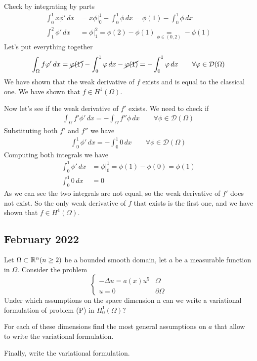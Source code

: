 Check by integrating by parts
\begin{align*}
    \int_0^1 x \phi' \, dx & = \left. x \phi \right|_0^1 - \int_0^1 \phi \, dx = \phi(1) - \int_0^1 \phi \, dx    \\
    \int_1^2 \phi' \, dx   & = \left. \phi \right|_1^2 = \phi(2) - \phi(1) \underset{\phi \in (0,2)}{=} - \phi(1)
\end{align*}
Let's put everything together
\[
    \begin{split}
        \int_\Omega f \phi' \, dx = \cancel{\phi(1)} - \int_0^1 \phi \, dx - \cancel{\phi(1)} = - \int_0^1 \phi \, dx \qquad \forall \phi \in \mathcal{D}(\Omega)
    \end{split}
\]
We have shown that the weak derivative of \(f\) exists and is equal to the
classical one. We have shown that \(f \in H^1(\Omega)\).

Now let's see if the weak derivative of \(f'\) exists. We need to check if
\[
    \begin{split}
        \int_\Omega f' \phi' \, dx = - \int_\Omega f'' \phi \, dx \qquad \forall \phi \in \mathcal{D}(\Omega)
    \end{split}
\]
Substituting both \(f'\) and \(f''\) we have
\[
    \begin{split}
        \int_0^1 \phi' \, dx = - \int_0^1 0 \, dx \qquad \forall \phi \in \mathcal{D}(\Omega)
    \end{split}
\]
Computing both integrals we have
\begin{align*}
    \int_0^1 \phi' \, dx & = \left. \phi \right|_0^1 = \phi(1) - \phi(0) = \phi(1) \\
    \int_0^1 0 \, dx     & = 0
\end{align*}
As we can see the two integrals are not equal, so the weak derivative of \(f'\) does not exist. So the only weak derivative of \(f\) that exists is the first one, and we have shown that \(f \in H^1(\Omega)\).

\newpage
\subsection{February 2022}
\begin{exercise}
    Let \(\Omega \subset \real^n (n \geq 2)\) be a bounded smooth domain, let \(a\) be a measurable function in \(\Omega\).
    Consider the problem
    \[
        \begin{cases}
            - \Delta u = a(x) u^5 & \Omega         \\
            u = 0                 & \partial\Omega
        \end{cases}
        \tag*{(P)}
    \]
    Under which assumptions on the space dimension n can we write a variational
    formulation of problem (P) in \(H^1_0(\Omega)\)?

    For each of these dimensions find the most general assumptions on \(a\) that
    allow to write the variational formulation.

    Finally, write the variational formulation.
\end{exercise}

